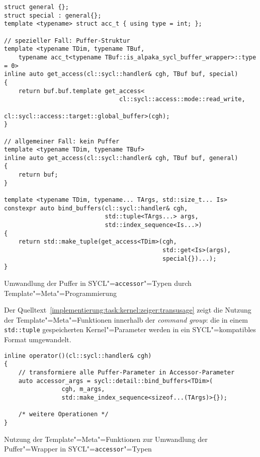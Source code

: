 \begin{code}
    \begin{verbatim}
struct general {};
struct special : general{};
template <typename> struct acc_t { using type = int; };

// spezieller Fall: Puffer-Struktur
template <typename TDim, typename TBuf,
    typename acc_t<typename TBuf::is_alpaka_sycl_buffer_wrapper>::type = 0>
inline auto get_access(cl::sycl::handler& cgh, TBuf buf, special)
{
    return buf.buf.template get_access<
                                cl::sycl::access::mode::read_write,
                                cl::sycl::access::target::global_buffer>(cgh);
}

// allgemeiner Fall: kein Puffer
template <typename TDim, typename TBuf>
inline auto get_access(cl::sycl::handler& cgh, TBuf buf, general)
{
    return buf;
}

template <typename TDim, typename... TArgs, std::size_t... Is>
constexpr auto bind_buffers(cl::sycl::handler& cgh,
                            std::tuple<TArgs...> args,
                            std::index_sequence<Is...>)
{
    return std::make_tuple(get_access<TDim>(cgh,
                                            std::get<Is>(args),
                                            special{})...);
}
    \end{verbatim}
    \caption{Umwandlung der Puffer in SYCL"=\texttt{accessor}"=Typen durch
             Template"=Meta"=Programmierung}
    \label{implementierung:task:kernel:zeiger:wrappertrans}
\end{code}

Der Quelltext~\ref{implementierung:task:kernel:zeiger:transusage} zeigt die
Nutzung der Template"=Meta"=Funktionen innerhalb der \textit{command group}:
die in einem \texttt{std::tuple} gespeicherten Kernel"=Parameter werden in ein
SYCL"=kompatibles Format umgewandelt.

\begin{code}
    \begin{verbatim}
inline operator()(cl::sycl::handler& cgh)
{
    // transformiere alle Puffer-Parameter in Accessor-Parameter
    auto accessor_args = sycl::detail::bind_buffers<TDim>(
                cgh, m_args,
                std::make_index_sequence<sizeof...(TArgs)>{});

    /* weitere Operationen */
}
    \end{verbatim}
    \caption{Nutzung der Template"=Meta"=Funktionen zur Umwandlung der
             Puffer"=Wrapper in SYCL"=\texttt{accessor}"=Typen}
    \label{implementierung:task:kernel:zeiger:transusage}
\end{code}

